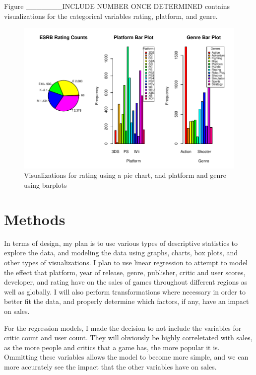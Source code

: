 \documentclass[12pt]{article}
\begin{document}
Figure _______INCLUDE NUMBER ONCE DETERMINED contains visualizations for the categorical variables rating, platform, and genre.


\begin{figure}[tbp]
  \centering
  \includegraphics[width=\textwidth]{categoricalplots.pdf}
  \caption{Visualizations for rating using a pie chart, and platform and genre using barplots}
  \label{fig:categoricalplots}
\end{figure}




\section{Methods}
\label{sec:meth}
In terms of design, my plan is to use various types of descriptive statistics to explore the data, and modeling the data using graphs, 
charts, box plots, and other types of visualizations. I plan to use linear regression to attempt to model the effect that platform, 
year of release, genre, publisher, critic and user scores, developer, and rating have on the sales of games throughout different regions 
as well as globally. I will also perform transformations where necessary in order to better fit the data, and properly determine which 
factors, if any, have an impact on sales.

For the regression models, I made the decision to not include the variables for critic count and user count. 
They will obviously be highly correletated with sales, as the more people and critics that a game has, the more popular it is.
Ommitting these variables allows the model to become more simple, and we can more accurately see the impact that the other
variables have on sales.
\end{document}
